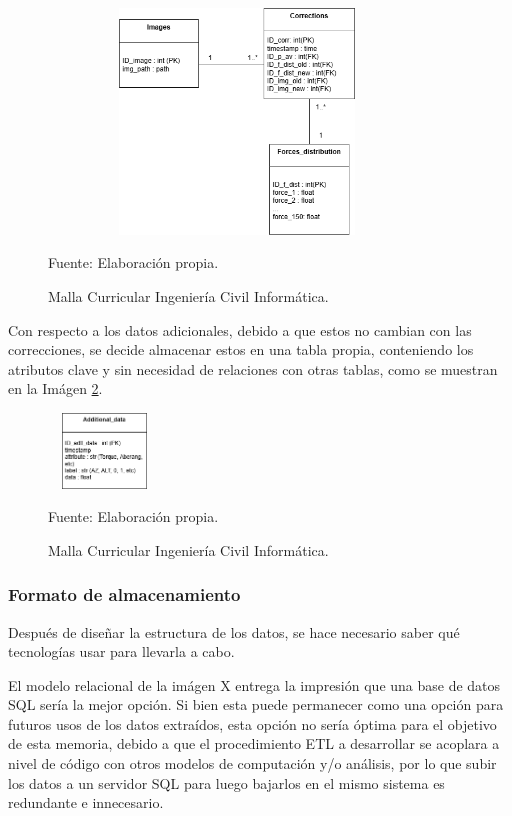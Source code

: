 \begin{figure}[h]
\centering
\includegraphics[width=10cm,height=6cm]{figures/db_diagram_corr.png}
\caption{\label{fig:db_corr} Malla Curricular Ingeniería Civil Informática.} Fuente: Elaboración propia.
\end{figure}

Con respecto a los datos adicionales, debido a que estos no cambian con las correcciones, se decide almacenar estos en una tabla propia, conteniendo los atributos clave y sin necesidad de relaciones con otras tablas, como se muestran en la Imágen \ref{fig:db_add_data}.

\begin{figure}[h]
\centering
\includegraphics[width=3cm,height=2cm]{figures/db_diagram_add_data.png}
\caption{\label{fig:db_add_data} Malla Curricular Ingeniería Civil Informática.} Fuente: Elaboración propia.
\end{figure}

\subsubsection{Formato de almacenamiento}

Después de diseñar la estructura de los datos, se hace necesario saber qué tecnologías usar para llevarla a cabo.

El modelo relacional de la imágen X entrega la impresión que una base de datos SQL sería la mejor opción. Si bien esta puede permanecer como una opción para futuros usos de los datos extraídos, esta opción no sería óptima para el objetivo de esta memoria, debido a que el procedimiento ETL a desarrollar se acoplara a nivel de código con otros modelos de computación y/o análisis, por lo que subir los datos a un servidor SQL para luego bajarlos en el mismo sistema es redundante e innecesario.

